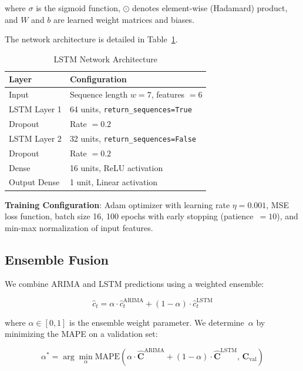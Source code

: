 \documentclass[conference]{IEEEtran}
\begin{document}
\noindent where $\sigma$ is the sigmoid function, $\odot$ denotes element-wise (Hadamard) product, and $W$ and $b$ are learned weight matrices and biases.

The network architecture is detailed in Table~\ref{tab:lstm}.

\begin{table}[htbp]
\caption{LSTM Network Architecture}
\label{tab:lstm}
\centering
\begin{tabular}{@{}ll@{}}
\toprule
\textbf{Layer} & \textbf{Configuration} \\
\midrule
Input & Sequence length $w=7$, features $= 6$ \\
LSTM Layer 1 & 64 units, \texttt{return\_sequences=True} \\
Dropout & Rate $= 0.2$ \\
LSTM Layer 2 & 32 units, \texttt{return\_sequences=False} \\
Dropout & Rate $= 0.2$ \\
Dense & 16 units, ReLU activation \\
Output Dense & 1 unit, Linear activation \\
\bottomrule
\end{tabular}
\end{table}

\textbf{Training Configuration}: Adam optimizer with learning rate $\eta = 0.001$, MSE loss function, batch size 16, 100 epochs with early stopping (patience~$=10$), and min-max normalization of input features.

\subsection{Ensemble Fusion}

We combine ARIMA and LSTM predictions using a weighted ensemble:

\begin{equation}
\hat{c}_t = \alpha \cdot \hat{c}_t^{\text{ARIMA}} + (1-\alpha) \cdot \hat{c}_t^{\text{LSTM}}
\label{eq:ensemble}
\end{equation}

\noindent where $\alpha \in [0,1]$ is the ensemble weight parameter. We determine~$\alpha$ by minimizing the MAPE on a validation set:

\begin{equation}
\alpha^* = \arg\min_{\alpha} \text{MAPE}\!\left(\alpha \cdot \hat{\mathbf{C}}^{\text{ARIMA}} + (1\!-\!\alpha) \cdot \hat{\mathbf{C}}^{\text{LSTM}},\, \mathbf{C}_{\text{val}}\right)
\label{eq:alpha}
\end{equation}
\end{document}

